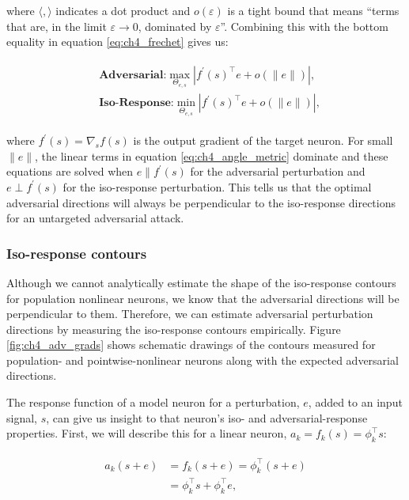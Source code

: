 where $\langle , \rangle$ indicates a dot product and $o(\varepsilon)$ is a tight bound that means ``terms that are, in the limit $\varepsilon \rightarrow 0$, dominated by $\varepsilon$''. Combining this with the bottom equality in equation \eqref{eq:ch4_frechet} gives us:

\begin{align}\label{eq:ch4_angle_metric}
\begin{split}
    &\textbf{Adversarial:} \max_{\Theta_{e,s}} |f^{\prime}(s)^\top e + o(\|e\|)|,\\
    &\textbf{Iso-Response:} \min_{\Theta_{e,s}} |f^{\prime}(s)^\top e + o(\|e\|)|,
\end{split}
\end{align}

where $f^{\prime}(s) = \nabla_{s}f(s)$ is the output gradient of the target neuron. For small $\|e\|$, the linear terms in equation \eqref{eq:ch4_angle_metric} dominate and these equations are solved when $e \parallel f^{\prime}(s)$ for the adversarial perturbation and $e \perp f^{\prime}(s)$ for the iso-response perturbation. This tells us that the optimal adversarial directions will always be perpendicular to the iso-response directions for an untargeted adversarial attack. 

\subsubsection{Iso-response contours}
Although we cannot analytically estimate the shape of the iso-response contours for population nonlinear neurons, we know that the adversarial directions will be perpendicular to them. Therefore, we can estimate adversarial perturbation directions by measuring the iso-response contours empirically. Figure \ref{fig:ch4_adv_grads} shows schematic drawings of the contours measured for population- and pointwise-nonlinear neurons along with the expected adversarial directions.

The response function of a model neuron for a perturbation, $e$, added to an input signal, $s$, can give us insight to that neuron's iso- and adversarial-response properties. First, we will describe this for a linear neuron, $a_{k}=f_{k}(s)=\phi_{k}^\top s$:

\begin{align}\label{eq:ch4_linear_neuron}
\begin{split}
    a_{k}(s+e) &= f_{k}(s+e) = \phi_{k}^\top (s + e) \\
    &= \phi_{k}^\top s +\phi_{k}^\top e,
\end{split}
\end{align}

